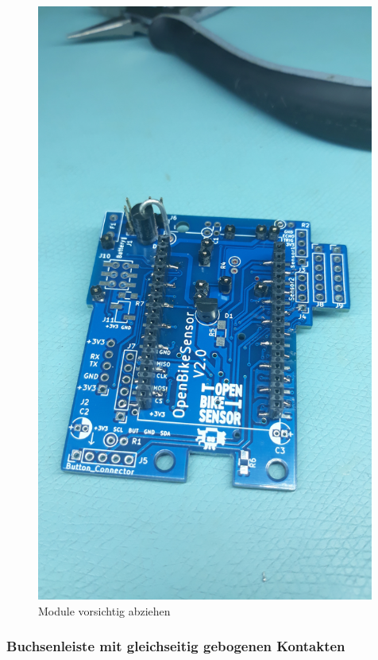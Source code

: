 \documentclass[12pt, a4paper]{article}		%
\begin{document}
\begin{figure}[H]
	\centering
		\includegraphics[width=0.99\textwidth]{Grafiken/20200726_180111.jpg}
	\caption{Module vorsichtig abziehen}
	\label{fig:20200726_180111}
\end{figure}


\subsubsection{Buchsenleiste mit gleichseitig gebogenen Kontakten}
\end{document}
